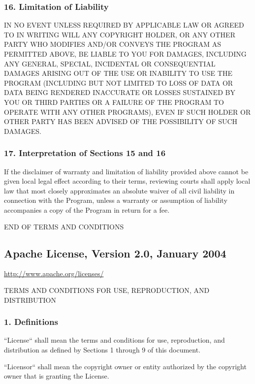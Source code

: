 \documentclass[a4paper, 11pt, twoside]{article}
\begin{document}
\subsubsection{16. Limitation of Liability}

IN NO EVENT UNLESS REQUIRED BY APPLICABLE LAW OR AGREED TO IN WRITING WILL ANY COPYRIGHT HOLDER, OR ANY OTHER PARTY WHO MODIFIES AND/OR CONVEYS THE PROGRAM AS PERMITTED ABOVE, BE LIABLE TO YOU FOR DAMAGES, INCLUDING ANY GENERAL, SPECIAL, INCIDENTAL OR CONSEQUENTIAL DAMAGES ARISING OUT OF THE USE OR INABILITY TO USE THE PROGRAM (INCLUDING BUT NOT LIMITED TO LOSS OF DATA OR DATA BEING RENDERED INACCURATE OR LOSSES SUSTAINED BY YOU OR THIRD PARTIES OR A FAILURE OF THE PROGRAM TO OPERATE WITH ANY OTHER PROGRAMS), EVEN IF SUCH HOLDER OR OTHER PARTY HAS BEEN ADVISED OF THE POSSIBILITY OF SUCH DAMAGES.

\subsubsection{17. Interpretation of Sections 15 and 16}

If the disclaimer of warranty and limitation of liability provided above cannot be given local legal effect according to their terms, reviewing courts shall apply local law that most closely approximates an absolute waiver of all civil liability in connection with the Program, unless a warranty or assumption of liability accompanies a copy of the Program in return for a fee.

END OF TERMS AND CONDITIONS

\subsection{Apache License, Version 2.0, January 2004}

\href{http://www.apache.org/licenses/}{http://www.apache.org/licenses/}

TERMS AND CONDITIONS FOR USE, REPRODUCTION, AND DISTRIBUTION

\subsubsection{1. Definitions}

“License“ shall mean the terms and conditions for use, reproduction, and distribution as defined by Sections 1 through 9 of this document.

“Licensor“ shall mean the copyright owner or entity authorized by the copyright owner that is granting the License.
\end{document}
